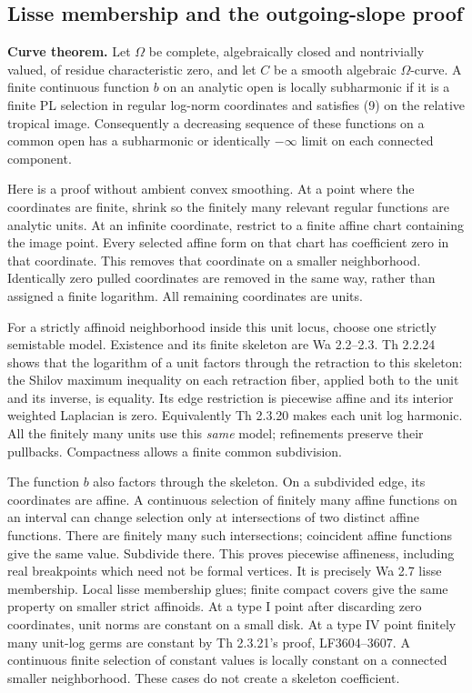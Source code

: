 \documentclass[
  11pt,
]{article}
\begin{document}
\subsection{Lisse membership and the outgoing-slope
proof}\label{lisse-membership-and-the-outgoing-slope-proof}

\textbf{Curve theorem.} Let \(\Omega\) be complete, algebraically closed
and nontrivially valued, of residue characteristic zero, and let \(C\)
be a smooth algebraic \(\Omega\)-curve. A finite continuous function
\(b\) on an analytic open is locally subharmonic if it is a finite PL
selection in regular log-norm coordinates and satisfies (9) on the
relative tropical image. Consequently a decreasing sequence of these
functions on a common open has a subharmonic or identically \(-\infty\)
limit on each connected component.

Here is a proof without ambient convex smoothing. At a point where the
coordinates are finite, shrink so the finitely many relevant regular
functions are analytic units. At an infinite coordinate, restrict to a
finite affine chart containing the image point. Every selected affine
form on that chart has coefficient zero in that coordinate. This removes
that coordinate on a smaller neighborhood. Identically zero pulled
coordinates are removed in the same way, rather than assigned a finite
logarithm. All remaining coordinates are units.

For a strictly affinoid neighborhood inside this unit locus, choose one
strictly semistable model. Existence and its finite skeleton are Wa
2.2--2.3. Th 2.2.24 shows that the logarithm of a unit factors through
the retraction to this skeleton: the Shilov maximum inequality on each
retraction fiber, applied both to the unit and its inverse, is equality.
Its edge restriction is piecewise affine and its interior weighted
Laplacian is zero. Equivalently Th 2.3.20 makes each unit log harmonic.
All the finitely many units use this \emph{same} model; refinements
preserve their pullbacks. Compactness allows a finite common
subdivision.

The function \(b\) also factors through the skeleton. On a subdivided
edge, its coordinates are affine. A continuous selection of finitely
many affine functions on an interval can change selection only at
intersections of two distinct affine functions. There are finitely many
such intersections; coincident affine functions give the same value.
Subdivide there. This proves piecewise affineness, including real
breakpoints which need not be formal vertices. It is precisely Wa 2.7
lisse membership. Local lisse membership glues; finite compact covers
give the same property on smaller strict affinoids. At a type I point
after discarding zero coordinates, unit norms are constant on a small
disk. At a type IV point finitely many unit-log germs are constant by Th
2.3.21's proof, LF3604--3607. A continuous finite selection of constant
values is locally constant on a connected smaller neighborhood. These
cases do not create a skeleton coefficient.
\end{document}
